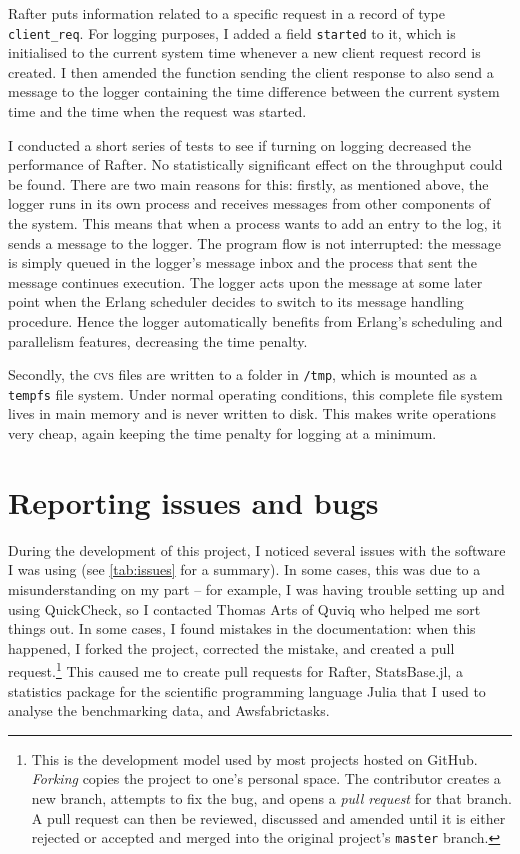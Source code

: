 \documentclass[12pt,chapterprefix=true,toc=bibliography,numbers=noendperiod,
               footnotes=multiple,twoside]{scrreprt}
\begin{document}
Rafter puts information related to a specific request in a record of type \texttt{client\_req}. For logging purposes, I added a field \texttt{started} to it, which is initialised to the current system time whenever a new client request record is created. I then amended the function sending the client response to also send a message to the logger containing the time difference between the current system time and the time when the request was started.

I conducted a short series of tests to see if turning on logging decreased the performance of Rafter. No statistically significant effect on the throughput could be found. There are two main reasons for this: firstly, as mentioned above, the logger runs in its own process and receives messages from other components of the system. This means that when a process wants to add an entry to the log, it sends a message to the logger. The program flow is not interrupted: the message is simply queued in the logger's message inbox and the process that sent the message continues execution. The logger acts upon the message at some later point when the Erlang scheduler decides to switch to its message handling procedure. Hence the logger automatically benefits from Erlang's scheduling and parallelism features, decreasing the time penalty.

Secondly, the \textsc{cvs} files are written to a folder in \texttt{/tmp}, which is mounted as a \texttt{tempfs} file system. Under normal operating conditions, this complete file system lives in main memory and is never written to disk. This makes write operations very cheap, again keeping the time penalty for logging at a minimum.

\section{Reporting issues and bugs}

During the development of this project, I noticed several issues with the software I was using (see \cref{tab:issues} for a summary). In some cases, this was due to a misunderstanding on my part -- for example, I was having trouble setting up and using QuickCheck, so I contacted Thomas Arts of Quviq who helped me sort things out. In some cases, I found mistakes in the documentation: when this happened, I forked the project, corrected the mistake, and created a pull request.\footnote{This is the development model used by most projects hosted on GitHub. \emph{Forking} copies the project to one's personal space. The contributor creates a new branch, attempts to fix the bug, and opens a \emph{pull request} for that branch. A pull request can then be reviewed, discussed and amended until it is either rejected or accepted and merged into the original project's \texttt{master} branch.} This caused me to create pull requests for Rafter, StatsBase.jl, a statistics package for the scientific programming language Julia that I used to analyse the benchmarking data, and Awsfabrictasks.
\end{document}
